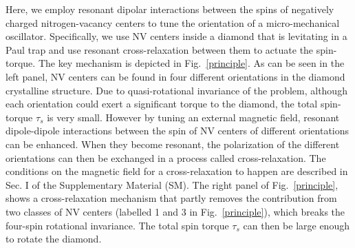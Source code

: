 \documentclass[preprintnumbers,amsmath,amssymb,superscriptaddress,twocolumn,showpacs]{revtex4-1}
\begin{document}
Here, we employ resonant dipolar interactions between the spins of negatively charged nitrogen-vacancy centers to tune the orientation of a micro-mechanical oscillator. 
Specifically, we use NV centers inside a diamond that is levitating in a Paul trap and use resonant cross-relaxation between them to actuate
the spin-torque.
The key mechanism is depicted in Fig.~\ref{principle}. 
As can be seen in the left panel, NV centers can be found in four different orientations in the diamond crystalline structure. Due to quasi-rotational invariance of the problem, although each orientation could exert a significant torque to the diamond, the total spin-torque $\tau_s$ is very small.
However by tuning an external magnetic field, resonant dipole-dipole interactions between the spin of NV centers of different orientations can be enhanced. 
When they become resonant, the polarization of the different orientations can then be exchanged in a process called cross-relaxation. The conditions on the magnetic field for a cross-relaxation to happen are described in Sec. I of the Supplementary Material (SM)\cite{SM_CR_meca}. \nocite{DelordPRL} \nocite{delordPhD} \nocite{DelordNat} \nocite{qutip1} \nocite{qutip2} \nocite{van_oort_cross-relaxation_1989} \nocite{choi_depolarization_2017}
The right panel of Fig.~\ref{principle}, shows a cross-relaxation mechanism that partly removes the contribution from two classes of NV centers (labelled 1 and 3 in Fig.~\ref{principle}), which breaks the four-spin rotational invariance. The total spin torque $\tau_s$ can then be large enough to rotate the diamond.
\end{document}
